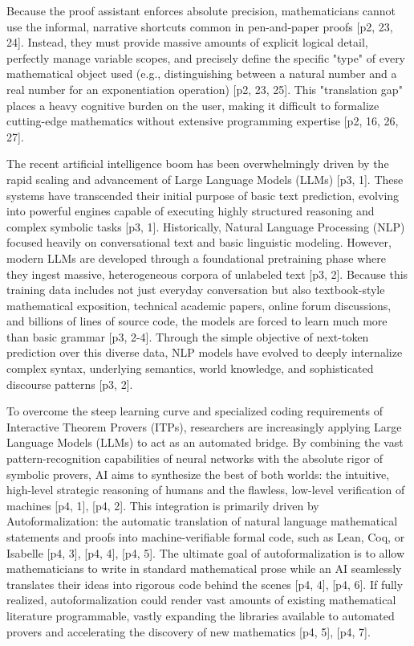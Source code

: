 Because the proof assistant enforces absolute precision, mathematicians cannot use the informal, narrative shortcuts common in pen-and-paper proofs [p2, 23, 24]. Instead, they must provide massive amounts of explicit logical detail, perfectly manage variable scopes, and precisely define the specific "type" of every mathematical object used (e.g., distinguishing between a natural number and a real number for an exponentiation operation) [p2, 23, 25]. This "translation gap" places a heavy cognitive burden on the user, making it difficult to formalize cutting-edge mathematics without extensive programming expertise [p2, 16, 26, 27].

The recent artificial intelligence boom has been overwhelmingly driven by the rapid scaling and advancement of Large Language Models (LLMs) [p3, 1]. These systems have transcended their initial purpose of basic text prediction, evolving into powerful engines capable of executing highly structured reasoning and complex symbolic tasks [p3, 1]. Historically, Natural Language Processing (NLP) focused heavily on conversational text and basic linguistic modeling. However, modern LLMs are developed through a foundational pretraining phase where they ingest massive, heterogeneous corpora of unlabeled text [p3, 2]. Because this training data includes not just everyday conversation but also textbook-style mathematical exposition, technical academic papers, online forum discussions, and billions of lines of source code, the models are forced to learn much more than basic grammar [p3, 2-4]. Through the simple objective of next-token prediction over this diverse data, NLP models have evolved to deeply internalize complex syntax, underlying semantics, world knowledge, and sophisticated discourse patterns [p3, 2].

To overcome the steep learning curve and specialized coding requirements of Interactive Theorem Provers (ITPs), researchers are increasingly applying Large Language Models (LLMs) to act as an automated bridge. By combining the vast pattern-recognition capabilities of neural networks with the absolute rigor of symbolic provers, AI aims to synthesize the best of both worlds: the intuitive, high-level strategic reasoning of humans and the flawless, low-level verification of machines [p4, 1], [p4, 2]. This integration is primarily driven by Autoformalization: the automatic translation of natural language mathematical statements and proofs into machine-verifiable formal code, such as Lean, Coq, or Isabelle [p4, 3], [p4, 4], [p4, 5]. The ultimate goal of autoformalization is to allow mathematicians to write in standard mathematical prose while an AI seamlessly translates their ideas into rigorous code behind the scenes [p4, 4], [p4, 6]. If fully realized, autoformalization could render vast amounts of existing mathematical literature programmable, vastly expanding the libraries available to automated provers and accelerating the discovery of new mathematics [p4, 5], [p4, 7].

